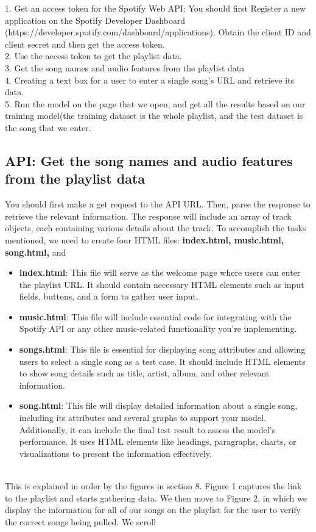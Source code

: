 \documentclass[titlepage]{article}
\begin{document}
1. Get an access token for the Spotify Web API:
You should first Register a new application on the Spotify Developer Dashboard (https://developer.spotify.com/dashboard/applications).
Obtain the client ID and client secret and then get the access token.\\
2. Use the access token to get the playlist data.\\
3. Get the song names and audio features from the playlist data\\
4. Creating a text box for a user to enter a single song's URL and retrieve its data.\\
5. Run the model on the page that we open, and get all the results based on our training model(the training dataset is the whole playlist, and the test dataset is the song that we enter.


\subsection{API: Get the song names and audio features from the playlist data}
You should first make a get request to the API URL. Then, parse the response to retrieve the relevant information. The response will include an array of track objects, each containing various details about the track. To accomplish the tasks mentioned, we need to create four HTML files: \textbf{index.html, music.html, song.html,} and \begin{itemize} 
    \item \textbf{index.html}: This file will serve as the welcome
        page where users can enter the playlist URL. It should contain necessary
        HTML elements such as input fields, buttons, and a form to gather user
        input.  
    \item \textbf{music.html}: This file will include essential code for
        integrating with the Spotify API or any other music-related functionality
        you're implementing.  
    \item \textbf{songs.html}: This file is essential for
        displaying song attributes and allowing users to select a single song as a
        test case. It should include HTML elements to show song details such as
        title, artist, album, and other relevant information.  
    \item \textbf{song.html}: This file will display detailed information about a
        single song, including its attributes and several graphs to support your
        model. Additionally, it can include the final test result to assess the
        model's performance. It uses HTML elements like headings, paragraphs,
        charts, or visualizations to present the information effectively.
\end{itemize}
\\
This is explained in order by the figures in section 8. Figure 1 captures the link to the playlist and starts gathering data. We then move to Figure 2, in which we display the information for all of our songs on the playlist for the user to verify the correct songs being pulled. We scroll
\end{document}
